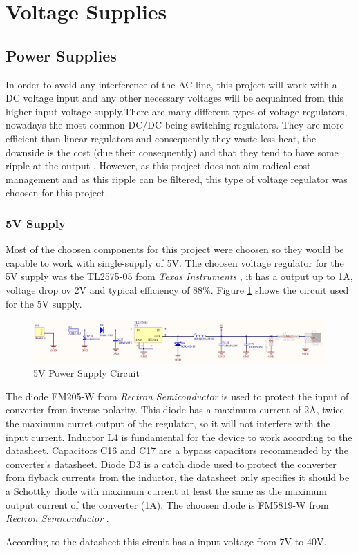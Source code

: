 \section{Voltage Supplies}\label{sec:voltage-supplies}

	\subsection{Power Supplies}\label{ssec:power-supplies}
		In order to avoid any interference of the AC line, this project will work with a DC voltage input and any other necessary voltages will be acquainted from this higher input voltage supply.There are many different types of voltage regulators, nowadays the most common DC/DC being switching regulators. They are more efficient than linear regulators and consequently they waste less heat, the downside is the cost (due their consequently) and that they tend to have some ripple at the output \cite{schweber2017}. However, as this project does not aim radical cost management and as this ripple can be filtered, this type of voltage regulator was choosen for this project.

		\subsubsection{5V Supply}\label{sssec:5v-supply}
			Most of the choosen components for this project were choosen so they would be capable to work with single-supply of 5V. The choosen voltage regulator for the 5V supply was the TL2575-05 from \textit{Texas Instruments} \cite{tl2575-05-datasheet}, it has a output up to 1A, voltage drop ov 2V and typical efficiency of 88$\%$. Figure \ref{fig:tl2575-05-circuit} shows the circuit used for the 5V supply.

			\begin{figure}[htbp]
				\centering
					\includegraphics[scale=0.4]{figuras/fig-tl2575-05-circuit.png}
				\caption{5V Power Supply Circuit \cite{tl2575-05-circuit}}
				\label{fig:tl2575-05-circuit}
			\end{figure}

			The diode FM205-W from \textit{Rectron Semiconductor} \cite{fm205-2-datasheet} is used to protect the input of converter from inverse polarity. This diode has a maximum current of 2A, twice the maximum curret output of the regulator, so it will not interfere with the input current. Inductor L4 is fundamental for the device to work according to the datasheet. Capacitors C16 and C17 are a bypass capacitors recommended by the converter's datasheet. Diode D3 is a catch diode used to protect the converter from flyback currents from the inductor, the datasheet only specifies it should be a Schottky diode with maximum current at least the same as the maximum output current of the converter (1A). The choosen diode is FM5819-W from \textit{Rectron Semiconductor} \cite{fm5819-w-datasheet}.
			\par
			According to the datasheet this circuit has a input voltage from 7V to 40V.

